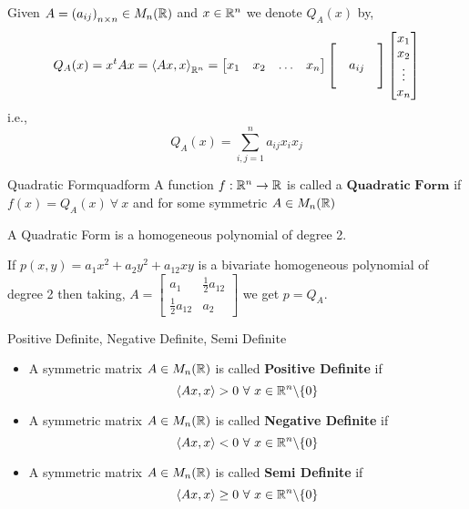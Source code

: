 \documentclass[../Analysis-3]{subfiles}
\begin{document}
\begin{notnBox}
    Given $A = \left( a_{ij} \right)_{n\times n} \in M_n(\mathbb{R})$ and $ x \in \mathbb{R}^n $ we denote $ Q_A(x) $  by,
    \[ Q_A(x) = x^tAx = {\left\langle Ax, x \right\rangle}_{\mathbb{R}^n} = {\begin{bmatrix}
            x_1 & x_2 & \ldots & x_n
        \end{bmatrix} \begin{bmatrix}
             &        & \\
             & a_{ij} & \\
             &        &
        \end{bmatrix} \begin{bmatrix}
            x_1    \\
            x_2    \\
            \vdots \\
            x_n
        \end{bmatrix}} \]
    i.e.,   \[ Q_A(x) = \sum_{i,j = 1}^{n} a_{ij} x_i x_j  \]
\end{notnBox}


\begin{Def}{Quadratic Form}{quadform}
    A function $f : \mathbb{R}^n \to \mathbb{R}$ is called a $\textbf{Quadratic Form}$ if $f(x) = Q_A(x) \ \forall\ x $ and for some symmetric $A \in M_n(\mathbb{R})$
\end{Def}

A Quadratic Form is a homogeneous polynomial of degree 2.

If $p(x,y) = a_1 x^2 + a_2 y^2 + a_{12} xy$
is a bivariate homogeneous polynomial of degree 2 then taking, $A = \begin{bmatrix}
        a_1                & \frac{1}{2} a_{12} \\
        \frac{1}{2} a_{12} & a_2
    \end{bmatrix}$ we get $p = Q_A$.

\begin{Def}{Positive Definite, Negative Definite, Semi Definite}{}
    \begin{itemize}
        \item A symmetric matrix $A \in M_n(\mathbb{R})$ is called \textbf{Positive Definite} if \[ \left\langle Ax, x \right\rangle > 0 \ \forall\ x \in \R^n \backslash \{0\} \]
        \item A symmetric matrix $A \in M_n(\mathbb{R})$ is called \textbf{Negative Definite} if \[ \left\langle Ax, x \right\rangle < 0 \ \forall\ x \in \R^n \backslash \{0\} \]
        \item A symmetric matrix $A \in M_n(\mathbb{R})$ is called \textbf{Semi Definite} if \[ \left\langle Ax, x \right\rangle \geq 0 \ \forall\ x \in \R^n \backslash \{0\} \]
    \end{itemize}
\end{Def}
\end{document}
